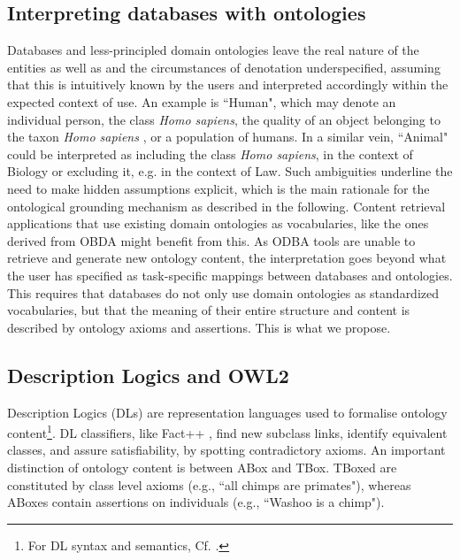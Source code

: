 \subsection{Interpreting databases with ontologies}
Databases and less-principled domain ontologies leave the real nature of the entities as well as and the circumstances of denotation underspecified, assuming that this is intuitively known by the users and interpreted accordingly within the expected context of use. An example is ``Human", which may denote an individual person, the class \textit{Homo sapiens}, the quality of an object belonging to the taxon \textit{Homo sapiens} \citep{Schulz2008}, or a population of humans. In a similar vein, ``Animal" could be interpreted as including the class \textit{Homo sapiens}, in the context of Biology or excluding it, e.g. in the context of Law. Such ambiguities underline the need to make hidden assumptions explicit, which is the main rationale for the ontological grounding mechanism as described in the following. 
Content retrieval applications that use existing domain ontologies as vocabularies, like the ones derived from OBDA might benefit from this. As ODBA tools are unable to retrieve and generate new ontology content, the interpretation goes beyond what the user has specified as task-specific mappings between databases and ontologies. This requires that databases do not only use domain ontologies as standardized vocabularies, but that the meaning of their entire structure and content is described by ontology axioms and assertions. This is what we propose.

\subsection{Description Logics and OWL2}

Description Logics (DLs) are representation languages used to formalise ontology content\footnote{For DL syntax and semantics, Cf. \cite{Baader2007g}.}. DL classifiers, like Fact++ \citep{Tsarkov2006}, find new subclass links, identify equivalent classes, and assure satisfiability, by spotting contradictory axioms. An important distinction of ontology content is between ABox and TBox. TBoxed are constituted by class level axioms (e.g., ``all chimps are primates"),  whereas ABoxes contain assertions on individuals (e.g., ``Washoo is a chimp").

